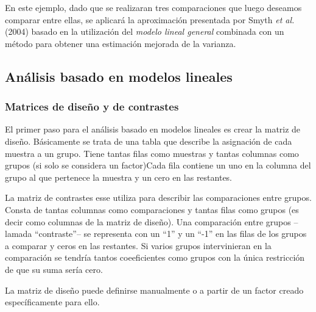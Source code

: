 \documentclass[a4paper]{article}\usepackage[]{graphicx}\usepackage[]{color}
\begin{document}
En este ejemplo, dado que se realizaran tres comparaciones que luego deseamos comparar entre ellas, se aplicará la aproximación presentada por Smyth \emph{et al.} (2004) basado 
en la utilización del \emph{modelo lineal general} combinada con un método 
para obtener una estimación mejorada de la varianza. 

\subsection{Análisis basado en modelos lineales}


\subsubsection{Matrices de diseño y de contrastes}

El primer paso para el análisis basado en modelos lineales es crear la matriz de diseño.
Básicamente se trata de una tabla que describe la asignación de cada muestra a un grupo. Tiene tantas filas como muestras y tantas columnas como grupos (si solo se considera un factor)Cada fila contiene un uno en la columna del grupo al que pertenece la muestra y un cero en las restantes.

La matriz de contrastes esse utiliza para describir las comparaciones entre grupos. Consta de tantas columnas como comparaciones y tantas filas como grupos (es decir como columnas de la matriz de diseño). Una comparaci\'on entre grupos --lamada ``contraste''-- se representa con un ``1'' y un ``-1'' en las filas de los grupos a comparar y ceros en las restantes. Si varios grupos intervinieran en la comparaci\'on se tendría tantos coeeficientes como grupos con la única restricción de que su suma sería cero. 

La matriz de diseño puede definirse manualmente o a partir de un factor 
creado específicamente para ello.
\end{document}
